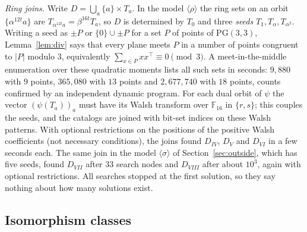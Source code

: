 \documentclass[11pt]{amsart}
\theoremstyle{definition}
\newcommand{\F}{\mathbb{F}}
\begin{document}
\emph{Ring joins.} Write $D=\bigcup_a\{a\}\times T_a$. In the model $\langle\rho\rangle$ the ring sets on an orbit $\{\alpha^{12t}a\}$ are $T_{\alpha^{12t}a}=\beta^{16t}T_a$, so $D$ is determined by $T_0$ and three \emph{seeds} $T_1,T_\alpha,T_{\alpha^2}$. Writing a seed as $\pm P$ or $\{0\}\cup\pm P$ for a set $P$ of points of $\mathrm{PG}(3,3)$, Lemma~\ref{lem:div} says that every plane meets $P$ in a number of points congruent to $|P|$ modulo $3$, equivalently $\sum_{x\in P}xx^\top\equiv0\pmod 3$. A meet-in-the-middle enumeration over these quadratic moments lists all such sets in seconds: $9{,}880$ with $9$ points, $365{,}080$ with $13$ points and $2{,}677{,}740$ with $18$ points, counts confirmed by an independent dynamic program. For each dual orbit of $\psi$ the vector $(\psi(T_a))_a$ must have its Walsh transform over $\F_{16}$ in $\{r,s\}$; this couples the seeds, and the catalogs are joined with bit-set indices on these Walsh patterns. With optional restrictions on the positions of the positive Walsh coefficients (not necessary conditions), the joins found $D_{IV}$, $D_V$ and $D_{VI}$ in a few seconds each. The same join in the model $\langle\sigma\rangle$ of Section~\ref{sec:outside}, which has five seeds, found $D_{VII}$ after $33$ search nodes and $D_{VIII}$ after about $10^3$, again with optional restrictions. All searches stopped at the first solution, so they say nothing about how many solutions exist.

\subsection{Isomorphism classes}
\end{document}
